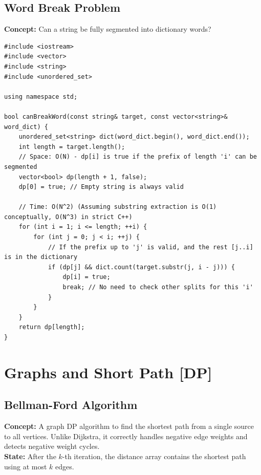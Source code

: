 \subsection{Word Break Problem}
\textbf{Concept:} Can a string be fully segmented into dictionary words?

\begin{lstlisting}
#include <iostream>
#include <vector>
#include <string>
#include <unordered_set>

using namespace std;

bool canBreakWord(const string& target, const vector<string>& word_dict) {
    unordered_set<string> dict(word_dict.begin(), word_dict.end());
    int length = target.length();
    // Space: O(N) - dp[i] is true if the prefix of length 'i' can be segmented
    vector<bool> dp(length + 1, false);
    dp[0] = true; // Empty string is always valid
    
    // Time: O(N^2) (Assuming substring extraction is O(1) conceptually, O(N^3) in strict C++)
    for (int i = 1; i <= length; ++i) {
        for (int j = 0; j < i; ++j) {
            // If the prefix up to 'j' is valid, and the rest [j..i] is in the dictionary
            if (dp[j] && dict.count(target.substr(j, i - j))) {
                dp[i] = true;
                break; // No need to check other splits for this 'i'
            }
        }
    }
    return dp[length];
}
\end{lstlisting}


\section{Graphs and Short Path [DP]}

\subsection{Bellman-Ford Algorithm}
\textbf{Concept:} A graph DP algorithm to find the shortest path from a single source to all vertices.
Unlike Dijkstra, it correctly handles negative edge weights and detects negative weight cycles.
\\
\textbf{State:} After the $k$-th iteration, the distance array contains the shortest path using at most $k$ edges.

